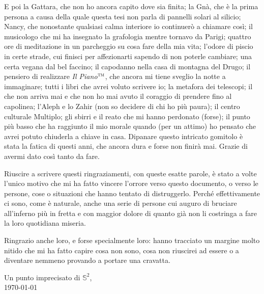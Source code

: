 E poi la Gattara, che non ho ancora capito dove sia finita; la Gnà, che è la prima persona a causa della quale questa tesi non parla di pannelli solari al silicio; Nancy, che nonostante qualsiasi calma interiore io continuerò a chiamare così; il musicologo che mi ha insegnato la grafologia mentre tornavo da Parigi; quattro ore di meditazione in un parcheggio su cosa fare della mia vita; l'odore di piscio in certe strade, cui finisci per affezionarti sapendo di non poterle cambiare; una certa vegana dal bel faccino; il capodanno nella casa di montagna del Drugo; il pensiero di realizzare \emph{Il Piano}${}^{\textsc{tm}}$, che ancora mi tiene sveglio la notte a immaginare; tutti i libri che avrei voluto scrivere io; la metafora dei telescopi; il  che non arriva mai e che non ho mai avuto il coraggio di prendere fino al capolinea; l'Aleph e lo Zahir (non so decidere di chi ho più paura); il centro culturale {\sf Multiplo}; gli sbirri e il reato che mi hanno perdonato (forse); il punto più basso che ha raggiunto il mio morale quando (per un attimo) ho pensato che avrei potuto chiuderla a chiave in casa.
Dipanare questo intricato gomitolo è stata la fatica di questi anni, che ancora dura e forse non finirà mai. Grazie di avermi dato così tanto da fare.

Riuscire a scrivere questi ringraziamenti, con queste esatte parole, è stato a volte l'unico motivo che mi ha fatto vincere l'orrore verso questo documento, o verso le persone, cose o situazioni che hanno tentato di distruggerlo. Perché effettivamente ci sono, come è naturale, anche una serie di persone cui auguro di bruciare all'inferno più in fretta e con maggior dolore di quanto già non li costringa a fare la loro quotidiana miseria.

Ringrazio anche loro, e forse specialmente loro: hanno tracciato un margine molto nitido che mi ha fatto capire cosa non sono, cosa non riuscirei ad essere o a diventare nemmeno provando a portare una cravatta.
\vspace*{\fill}

\begin{flushright}
Un punto imprecisato di $\mathbb{S}^2$,\\
\today
\end{flushright}